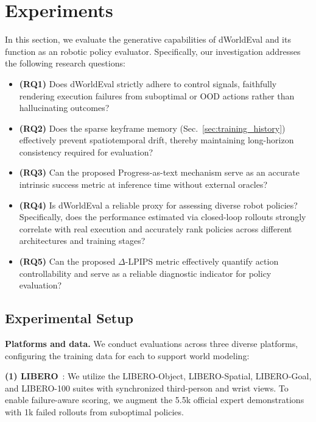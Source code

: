 \section{Experiments}
\label{sec:experiments}

In this section, we evaluate the generative capabilities of dWorldEval and its function as an robotic policy evaluator. 
Specifically, our investigation addresses the following research questions:
\begin{itemize}
    \item \textbf{(RQ1)}
    Does dWorldEval strictly adhere to control signals, faithfully rendering execution failures from suboptimal or OOD actions rather than hallucinating outcomes?

    \item \textbf{(RQ2)}
    Does the sparse keyframe memory
    (Sec.~\ref{sec:training_history}) 
    effectively prevent spatiotemporal drift, thereby maintaining long-horizon consistency required for evaluation?

    \item \textbf{(RQ3)}
    Can the proposed Progress-as-text mechanism serve as an accurate intrinsic success metric at inference time without external oracles?

    \item \textbf{(RQ4)}
    Is dWorldEval a reliable proxy for assessing diverse robot policies? Specifically, does the performance estimated via closed-loop rollouts strongly correlate with real execution and accurately rank policies across different architectures and training stages?

    \item \textbf{(RQ5)} 
    Can the proposed $\Delta$-LPIPS metric effectively quantify action controllability and serve as a reliable diagnostic indicator for policy evaluation?
\end{itemize}


\subsection{Experimental Setup}
\label{subsec:setup}

\textbf{Platforms and data.} 
We conduct evaluations across three diverse platforms, configuring the training data for each to support world modeling:

\textbf{(1) LIBERO}~\cite{liu2024libero}:
We utilize the LIBERO-Object, LIBERO-Spatial, LIBERO-Goal, and LIBERO-100 suites with synchronized third-person and wrist views.
To enable failure-aware scoring, we augment the 5.5k official expert demonstrations with 1k failed rollouts from suboptimal policies.

